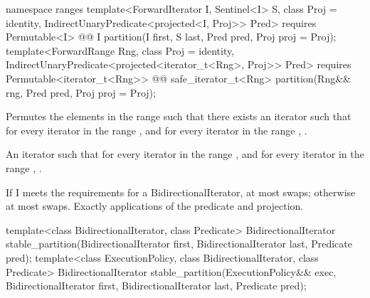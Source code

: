 \begin{addedblock}
%
\begin{itemdecl}
namespace ranges {
  template<ForwardIterator I, Sentinel<I> S, class Proj = identity,
      IndirectUnaryPredicate<projected<I, Proj>> Pred>
    requires Permutable<I>
    @@ I
      partition(I first, S last, Pred pred, Proj proj = Proj{});
  template<ForwardRange Rng, class Proj = identity,
      IndirectUnaryPredicate<projected<iterator_t<Rng>, Proj>> Pred>
    requires Permutable<iterator_t<Rng>>
    @@ safe_iterator_t<Rng>
      partition(Rng&& rng, Pred pred, Proj proj = Proj{});
}
\end{itemdecl}

\begin{itemdescr}
\pnum
\effects Permutes the elements in the range  such that there exists an iterator 
such that for every iterator  in the range 
, and for every iterator  in the
range , .

\pnum
\returns An iterator  such that for every iterator  in the range 
,
and for every iterator  in the range ,
.

\pnum
\complexity If I meets the requirements for a BidirectionalIterator, at most
 swaps; otherwise at most  swaps.
Exactly  applications of the predicate and projection.
\end{itemdescr}
\end{addedblock}

%
\begin{itemdecl}
template<class BidirectionalIterator, class Predicate>
  BidirectionalIterator
    stable_partition(BidirectionalIterator first, BidirectionalIterator last, Predicate pred);
template<class ExecutionPolicy, class BidirectionalIterator, class Predicate>
  BidirectionalIterator
    stable_partition(ExecutionPolicy&& exec,
                     BidirectionalIterator first, BidirectionalIterator last, Predicate pred);
\end{itemdecl}

